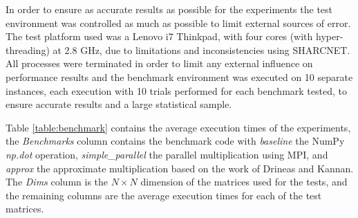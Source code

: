 \documentclass[oneside]{article}
\begin{document}
In order to ensure as accurate results as possible for the experiments the test environment was controlled as much as possible to limit external sources of error. The test platform used was a Lenovo i7 Thinkpad, with four cores (with hyper-threading) at 2.8 GHz, due to limitations and inconsistencies using SHARCNET. All processes were terminated in order to limit any external influence on performance results and the benchmark environment was executed on 10 separate instances, each execution with 10 trials performed for each benchmark tested, to ensure accurate results and a large statistical sample.

Table \ref{table:benchmark} contains the average execution times of the experiments, the \emph{Benchmarks} column contains the benchmark code with \emph{baseline} the NumPy \emph{np.dot} operation, \emph{simple\_parallel} the parallel multiplication using MPI, and \emph{approx} the approximate multiplication based on the work of Drineas and Kannan. The \emph{Dims} column is the $N \times N$ dimension of the matrices used for the tests, and the remaining columns are the average execution times for each of the test matrices.
\end{document}
